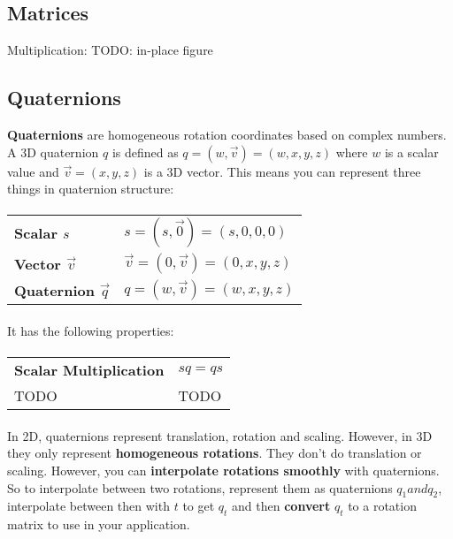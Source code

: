 \documentclass{article}
\begin{document}
\subsection{Matrices}

Multiplication: TODO: in-place figure

\subsection{Quaternions}

\textbf{Quaternions} are homogeneous rotation coordinates based on complex numbers. A 3D quaternion $q$ is defined as $q = (w, \vec{v}) = (w, x, y, z)$ where $w$ is a scalar value and $\vec{v} = (x, y, z)$ is a 3D vector. This means you can represent three things in quaternion structure:
\paragraph{}
\begin{tabular}{ll}
	\textbf{Scalar $s$} & $s = (s, \vec{0}) = (s, 0, 0, 0)$ \\
	\textbf{Vector $\vec{v}$} & $ \vec{v} = (0, \vec{v}) = (0, x, y, z)$ \\
	\textbf{Quaternion $\vec{q}$} & $ q = (w, \vec{v}) = (w, x, y, z)$ \\
\end{tabular}
\paragraph{}
It has the following properties:
\paragraph{}
\begin{tabular}{ll}
	\textbf{Scalar Multiplication} & $sq = qs$ \\
	TODO & TODO \\
\end{tabular}
\paragraph{}

In 2D, quaternions represent translation, rotation and scaling. However, in 3D they only represent \textbf{homogeneous rotations}. They don't do translation or scaling. However, you can \textbf{interpolate rotations smoothly} with quaternions. So to interpolate between two rotations, represent them as quaternions $q_1 and q_2$, interpolate between then with $t$ to get $q_t$ and then \textbf{convert} $q_t$ to a rotation matrix to use in your application.
\end{document}
